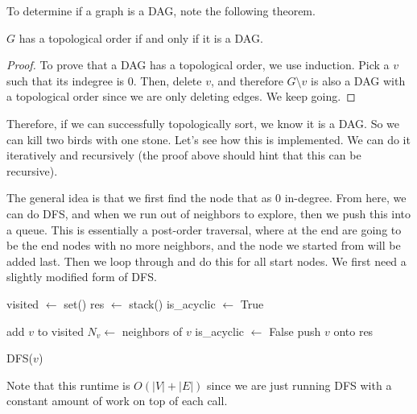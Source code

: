 \documentclass{article}
\begin{document}
    To determine if a graph is a DAG, note the following theorem. 

    \begin{theorem}
      $G$ has a topological order if and only if it is a DAG. 
    \end{theorem}
    \begin{proof}
      To prove that a DAG has a topological order, we use induction. Pick a $v$ such that its indegree is $0$. Then, delete $v$, and therefore $G \setminus v$ is also a DAG with a topological order since we are only deleting edges. We keep going. 
    \end{proof}

    Therefore, if we can successfully topologically sort, we know it is a DAG. So we can kill two birds with one stone. Let's see how this is implemented. We can do it iteratively and recursively (the proof above should hint that this can be recursive). 

    \begin{algo}
      The general idea is that we first find the node that as $0$ in-degree. From here, we can do DFS, and when we run out of neighbors to explore, then we push this into a queue. This is essentially a post-order traversal, where at the end are going to be the end nodes with no more neighbors, and the node we started from will be added last. Then we loop through and do this for all start nodes. We first need a slightly modified form of DFS. 

      \begin{algorithm}[H]
        \label{alg:iterative_top_sort}
        \begin{algorithmic}[1]
          \State visited $\gets$ set()
          \State res $\gets$ stack() 
          \State is\_acyclic $\gets$ True

              \State add $v$ to visited 
              \State $N_v \gets$ neighbors of $v$ 
                  \State is\_acyclic $\gets$ False 
                \EndIf
                \State {}
              \EndFor 
              \State push $v$ onto res
            \EndIf
          \EndFunction

          \State 

              \State DFS($v$)
            \EndFor
              \State {}
            \EndIf
            \State {}
          \EndFunction
        \end{algorithmic}
      \end{algorithm}
      Note that this runtime is $O(|V| + |E|)$ since we are just running DFS with a constant amount of work on top of each call. 
    \end{algo}
\end{document}
